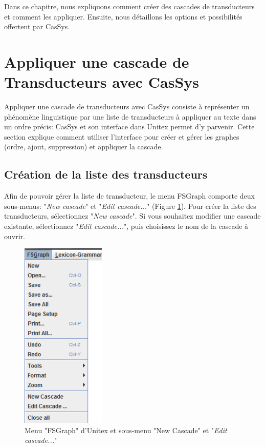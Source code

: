 \bigskip
\noindent Dans ce chapitre, nous expliquons comment créer des cascades de transducteurs et
comment les appliquer. Ensuite, nous détaillons les options et possibilités offertent par CasSys.

\section{Appliquer une cascade de Transducteurs avec CasSys}
\label{section:applyCascade}
Appliquer une cascade de transducteurs avec CasSys consiste à représenter un phénomène linguistique par une
liste de transducteurs à appliquer au texte dans un ordre précis: CasSys et son interface dans Unitex permet d'y parvenir.
Cette section explique comment utiliser l'interface pour créer et gérer les graphes (ordre, ajout, suppression) et appliquer la cascade.   

\subsection{Création de la liste des transducteurs}
\label{subsec:listTrans}

\bigskip
\noindent Afin de pouvoir gérer la liste de transducteur, le menu FSGraph comporte deux sous-menus:
"\textit{New cascade}" et "\textit{Edit cascade...}" (Figure \ref{fig13-08}). Pour créer la liste des
transducteurs, sélectionnez "\textit{New cascade}". Si vous souhaitez modifier une cascade existante, sélectionnez
"\textit{Edit cascade...}", puis  choisissez le nom de la cascade à ouvrir.

\begin{figure}[!htb]
 \centering
 \includegraphics[width=4cm]{resources/img/fig13-08.png}
 \caption{Menu "FSGraph" d'Unitex et sous-menu "New Cascade" et "\textit{Edit cascade...}"}
 \label{fig13-08}
\end{figure}

